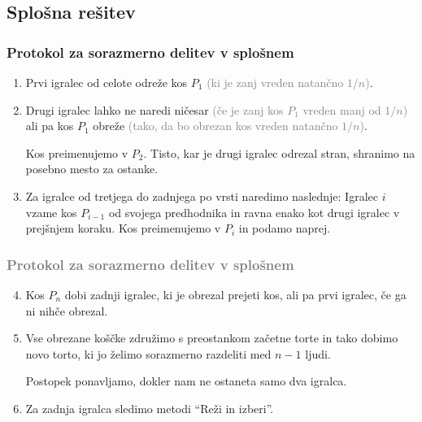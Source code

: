 \documentclass{beamer}
\begin{document}
\subsection{Splošna rešitev}
\begin{frame}
\frametitle{Protokol za sorazmerno delitev v splošnem}

\begin{enumerate}

\item Prvi igralec od celote odreže kos $P_1$ \textcolor{gray}{(ki je zanj vreden natančno $1/n$)}.

\item Drugi igralec lahko ne naredi ničesar \textcolor{gray}{(če je zanj kos $P_1$ vreden manj od $1/n$)}
ali pa kos $P_1$ obreže \textcolor{gray}{(tako, da bo obrezan kos vreden natančno $1/n$)}.

Kos preimenujemo v $P_2$. Tisto, kar je drugi igralec odrezal stran, shranimo na posebno mesto za ostanke.

\item Za igralce od tretjega do zadnjega po vrsti naredimo naslednje: Igralec $i$ vzame kos $P_{i-1}$ od svojega predhodnika in ravna enako kot drugi igralec v prejšnjem koraku. Kos preimenujemo v $P_i$ in podamo naprej. %

\end{enumerate}
\end{frame}
\begin{frame}
\frametitle{\textcolor{gray}{Protokol za sorazmerno delitev v splošnem}}
\begin{enumerate}
\setcounter{enumi}{3}

\item Kos $P_n$ dobi zadnji igralec, ki je obrezal prejeti kos, ali pa prvi igralec, če ga ni nihče obrezal.

\item Vse obrezane koščke združimo s preostankom začetne torte in tako dobimo novo torto, ki jo želimo sorazmerno razdeliti med $n - 1$ ljudi. 

Postopek ponavljamo, dokler nam ne ostaneta samo dva igralca.

\item Za zadnja igralca sledimo metodi ``Reži in izberi''.

\end{enumerate}

\end{frame}
\end{document}
